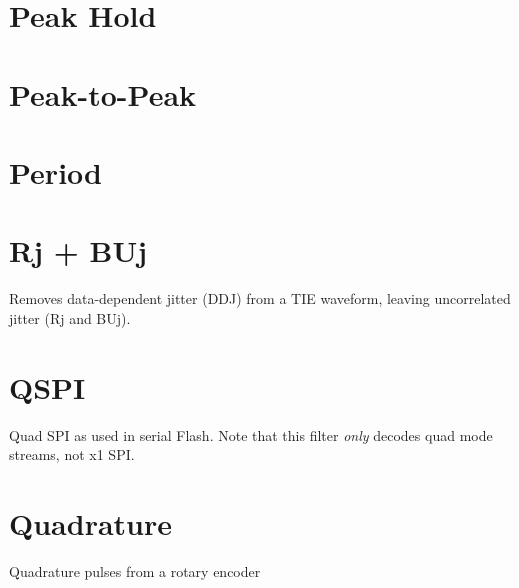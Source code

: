\pagebreak
\section{Peak Hold}

\pagebreak
\section{Peak-to-Peak}

\pagebreak
\section{Period}

\pagebreak
\section{Rj + BUj}

Removes data-dependent jitter (DDJ) from a TIE waveform, leaving uncorrelated jitter (Rj and BUj).

\pagebreak
\section{QSPI}

Quad SPI as used in serial Flash. Note that this filter \emph{only} decodes quad mode streams, not x1 SPI.

\pagebreak
\section{Quadrature}

Quadrature pulses from a rotary encoder

\pagebreak
